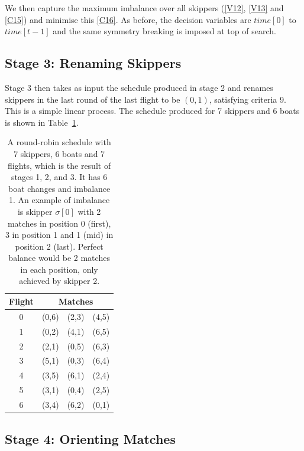 \documentclass{llncs}
\newcommand{\timeVar}{\mathit{time}}
\begin{document}
We then capture the maximum imbalance over all skippers (\ref{V12}, \ref{V13}
and \ref{C15}) and minimise this \eqref{C16}. As before, the decision variables
are $\timeVar[{0}]$ to $\timeVar[{t-1}]$ and the same symmetry breaking is
imposed at top of search.

\subsection{Stage 3: Renaming Skippers}

Stage 3 then takes as input the schedule produced in stage 2 and renames
skippers in the last round of the last flight to be $(0,1)$, satisfying criteria
9. This is a simple linear process. The schedule produced for 7 skippers and 6
boats is shown in Table~\ref{tab2}.

\begin{table}
    \setlength{\tabcolsep}{3pt}
    \begin{tabular}{cccc}
        \toprule
        Flight & \multicolumn{3}{c}{Matches} \\ \midrule
        0 & (0,6) & (2,3) & (4,5) \\
        1 & (0,2) & (4,1) & (6,5) \\
        2 & (2,1) & (0,5) & (6,3) \\
        3 & (5,1) & (0,3) & (6,4) \\
        4 & (3,5) & (6,1) & (2,4) \\
        5 & (3,1) & (0,4) & (2,5) \\
        6 & (3,4) & (6,2) & (0,1) \\ \bottomrule
    \end{tabular}
    \caption{A round-robin schedule with 7 skippers, 6 boats and 7 flights,
        which is the result of stages 1, 2, and 3. It has 6 boat changes
        and imbalance 1. An example of imbalance is skipper $\sigma[{0}]$
        with 2 matches in position 0 (first), 3 in position 1 and 1 (mid)
        in position 2 (last). Perfect balance would be 2 matches in each
    position, only achieved by skipper 2.}\label{tab2}
\end{table}

\subsection{Stage 4: Orienting Matches}
\end{document}

